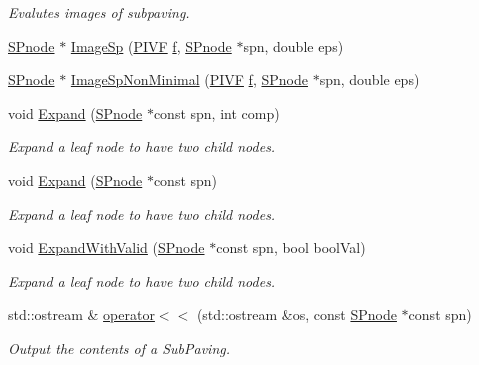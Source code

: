 \begin{DoxyCompactItemize}
\begin{DoxyCompactList}\small\item\em \-Evalutes images of subpaving. \end{DoxyCompactList}\item 
\hyperlink{classsubpavings_1_1SPnode}{\-S\-Pnode} $\ast$ \hyperlink{namespacesubpavings_af6d00551176ec8a60444c7115aa08ca0}{\-Image\-Sp} (\hyperlink{namespacesubpavings_af9ec133810ddce70b48381d444e2ec22}{\-P\-I\-V\-F} \hyperlink{errorfunc_8hpp_aacb77b1211a6ca2e2beff1811cf9ecf4}{f}, \hyperlink{classsubpavings_1_1SPnode}{\-S\-Pnode} $\ast$spn, double eps)
\item 
\hyperlink{classsubpavings_1_1SPnode}{\-S\-Pnode} $\ast$ \hyperlink{namespacesubpavings_af0cce4ab9cf30918f62b403ce840776b}{\-Image\-Sp\-Non\-Minimal} (\hyperlink{namespacesubpavings_af9ec133810ddce70b48381d444e2ec22}{\-P\-I\-V\-F} \hyperlink{errorfunc_8hpp_aacb77b1211a6ca2e2beff1811cf9ecf4}{f}, \hyperlink{classsubpavings_1_1SPnode}{\-S\-Pnode} $\ast$spn, double eps)
\item 
void \hyperlink{namespacesubpavings_a6bce1a57598248196dd6b3e6010e724a}{\-Expand} (\hyperlink{classsubpavings_1_1SPnode}{\-S\-Pnode} $\ast$const spn, int comp)
\begin{DoxyCompactList}\small\item\em \-Expand a leaf node to have two child nodes. \end{DoxyCompactList}\item 
void \hyperlink{namespacesubpavings_a2f85b5496c772efbfd75e50c16a5ab01}{\-Expand} (\hyperlink{classsubpavings_1_1SPnode}{\-S\-Pnode} $\ast$const spn)
\begin{DoxyCompactList}\small\item\em \-Expand a leaf node to have two child nodes. \end{DoxyCompactList}\item 
void \hyperlink{namespacesubpavings_a6a89808457c34dbca09c2c75ef57c169}{\-Expand\-With\-Valid} (\hyperlink{classsubpavings_1_1SPnode}{\-S\-Pnode} $\ast$const spn, bool bool\-Val)
\begin{DoxyCompactList}\small\item\em \-Expand a leaf node to have two child nodes. \end{DoxyCompactList}\item 
std\-::ostream \& \hyperlink{namespacesubpavings_a7288149f86d1e0c956f45dcd849a08fc}{operator$<$$<$} (std\-::ostream \&os, const \hyperlink{classsubpavings_1_1SPnode}{\-S\-Pnode} $\ast$const spn)
\begin{DoxyCompactList}\small\item\em \-Output the contents of a \-Sub\-Paving. \end{DoxyCompactList}\item 

\end{DoxyCompactItemize}
